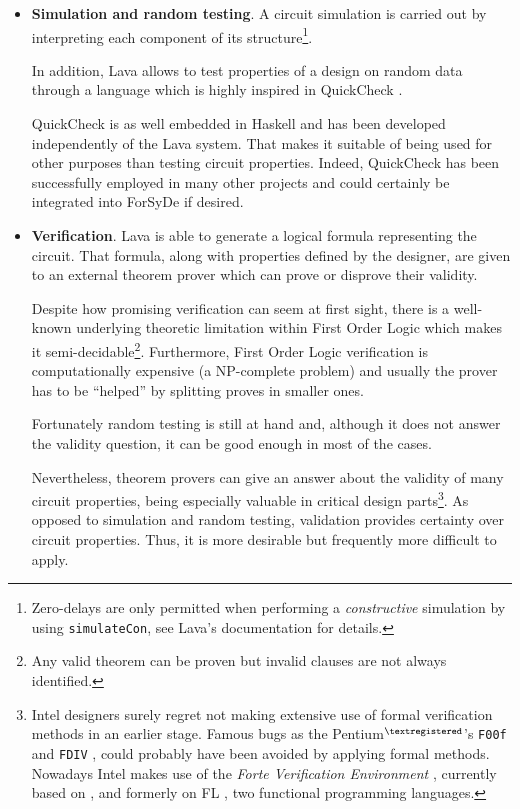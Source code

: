 \begin{itemize}
\item \textbf{Simulation and random testing}. A circuit simulation
  is carried out by interpreting each component of its
  structure\footnote{Zero-delays are only permitted when performing a
    \textit{constructive} simulation by using \texttt{simulateCon},
    see Lava's documentation \cite{lava:thesis} for details.}.

  In addition, Lava allows to test properties of a
  design on random data through a language which is highly inspired in
  \textsf{QuickCheck} \cite{quickcheck}.
  
  \textsf{QuickCheck} is as well embedded in Haskell and has been
  developed independently of the Lava system. That makes it suitable
  of being used for other purposes than testing circuit properties.
  Indeed, \textsf{QuickCheck} has been successfully employed in many
  other projects and could certainly be integrated into ForSyDe if
  desired.

\item \textbf{Verification}. Lava is able to generate a logical
  formula representing the circuit. That formula, along with
  properties defined by the designer, are given to an external theorem
  prover which can prove or disprove their validity.
  
  Despite how promising verification can seem at first sight, there is
  a well-known underlying theoretic limitation within First Order
  Logic which makes it semi-decidable\footnote{Any valid theorem can
    be proven but invalid clauses are not always identified.}.
  Furthermore, First Order Logic verification is computationally
  expensive (a NP-complete problem) and usually the prover has to be
  ``helped'' by splitting proves in smaller ones.
  
  Fortunately random testing is still at hand and, although it does
  not answer the validity question, it can be good enough in most of
  the cases.


  
  Nevertheless, theorem provers can give an answer about the validity
  of many circuit properties, being especially valuable in critical
  design parts\footnote{Intel designers surely regret not making
  extensive use of formal verification methods in an earlier stage.
  Famous bugs as the Pentium{\tiny $^{\textregistered}$}'s
  \texttt{F00f} \cite{f00f} and \texttt{FDIV} \cite{fdiv}, could
  probably have been avoided by applying formal methods. Nowadays
  Intel makes use of the \textit{Forte Verification
  Environment} \cite{forte}, currently based on
  , and formerly on FL \cite{fl}, two
  functional programming languages.}. As opposed to simulation and
  random testing, validation provides certainty over circuit
  properties. Thus, it is more desirable but frequently more difficult
  to apply.




\end{itemize}
